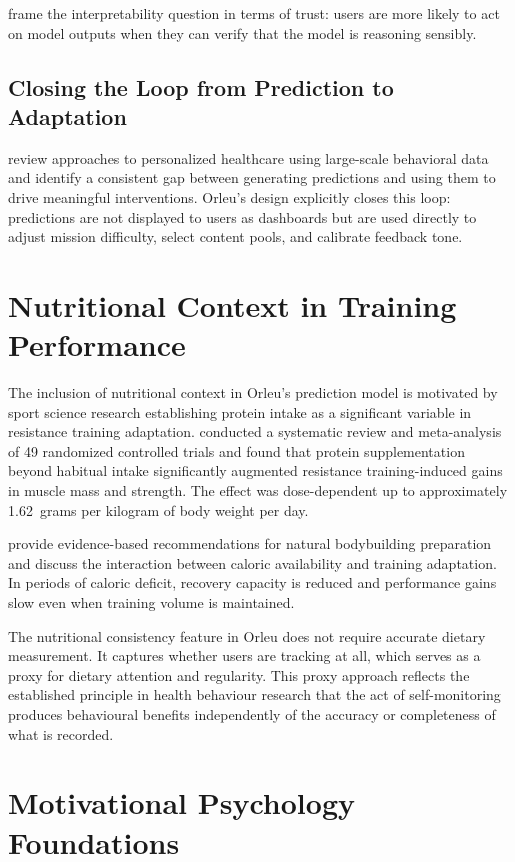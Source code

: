 \documentclass[12pt, a4paper]{report}
\begin{document}
\citet{ribeiro2016} frame the interpretability question in terms of trust: users are more likely to act on model outputs when they can verify that the model is reasoning sensibly.

\subsection{Closing the Loop from Prediction to Adaptation}

\citet{chawla2013} review approaches to personalized healthcare using large-scale behavioral data and identify a consistent gap between generating predictions and using them to drive meaningful interventions. Orleu's design explicitly closes this loop: predictions are not displayed to users as dashboards but are used directly to adjust mission difficulty, select content pools, and calibrate feedback tone.

\section{Nutritional Context in Training Performance}

The inclusion of nutritional context in Orleu's prediction model is motivated by sport science research establishing protein intake as a significant variable in resistance training adaptation. \citet{morton2018} conducted a systematic review and meta-analysis of 49 randomized controlled trials and found that protein supplementation beyond habitual intake significantly augmented resistance training-induced gains in muscle mass and strength. The effect was dose-dependent up to approximately 1.62~grams per kilogram of body weight per day.

\citet{helms2014} provide evidence-based recommendations for natural bodybuilding preparation and discuss the interaction between caloric availability and training adaptation. In periods of caloric deficit, recovery capacity is reduced and performance gains slow even when training volume is maintained.

The nutritional consistency feature in Orleu does not require accurate dietary measurement. It captures whether users are tracking at all, which serves as a proxy for dietary attention and regularity. This proxy approach reflects the established principle in health behaviour research that the act of self-monitoring produces behavioural benefits independently of the accuracy or completeness of what is recorded.

\section{Motivational Psychology Foundations}
\end{document}
